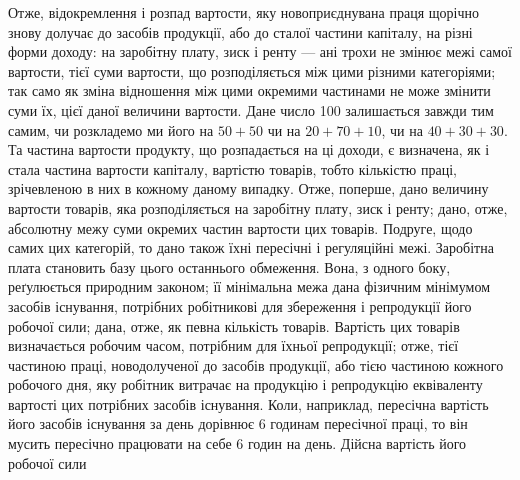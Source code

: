 Отже, відокремлення і розпад вартости, яку новоприєднувана праця щорічно
знову долучає до засобів продукції, або до сталої частини капіталу, на різні форми
доходу: на заробітну плату, зиск і ренту — ані трохи не змінює межі самої вартости,
тієї суми вартости, що розподіляється між цими різними категоріями; так
само як зміна відношення між цими окремими частинами не може змінити суми їх,
цієї даної величини вартости. Дане число 100 залишається завжди тим самим, чи
розкладемо ми його на $50 + 50$ чи на $20 + 70 + 10$, чи на $40 + 30 + 30$. Та
частина вартости продукту, що розпадається на ці доходи, є визначена, як і стала
частина вартости капіталу, вартістю товарів, тобто кількістю праці, зрічевленою
в них в кожному даному випадку. Отже, поперше, дано величину вартости
товарів, яка розподіляється на заробітну плату, зиск і ренту; дано, отже, абсолютну
межу суми окремих частин вартости цих товарів. Подруге, щодо самих
цих категорій, то дано також їхні пересічні і регуляційні межі. Заробітна плата
становить базу цього останнього обмеження. Вона, з одного боку, реґулюється
природним законом; її мінімальна межа дана фізичним мінімумом засобів існування,
потрібних робітникові для збереження і репродукції його робочої сили;
дана, отже, як певна кількість товарів. Вартість цих товарів визначається робочим
часом, потрібним для їхньої репродукції; отже, тієї частиною праці, новодолученої
до засобів продукції, або тією частиною кожного робочого дня, яку
робітник витрачає на продукцію і репродукцію еквіваленту вартості цих потрібних
засобів існування. Коли, наприклад, пересічна вартість його засобів
існування за день дорівнює 6 годинам пересічної праці, то він мусить пересічно
працювати на себе 6 годин на день. Дійсна вартість його робочої сили
\parbreak{}  %
